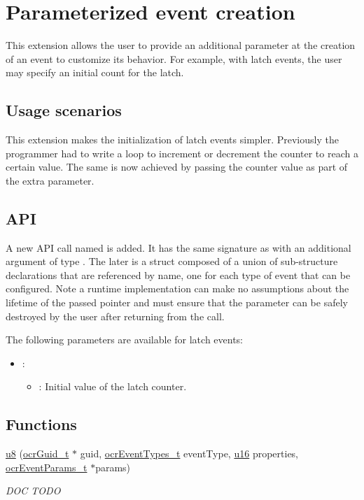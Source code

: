 \section{Parameterized event creation}
\label{sec:paramEvents}
This extension allows the user to provide an additional parameter at
the creation of an event to customize its behavior. For example, with
latch events, the user may specify an initial count for the latch.

\subsection{Usage scenarios}
This extension makes the initialization of latch events
simpler. Previously the programmer had to write a loop to increment or
decrement the counter to reach a certain value. The same is now
achieved by passing the counter value as part of the extra parameter.

\subsection{API}
A new API call named
\hyperlink{func_ocrEventCreateParams}{}
is added. It has the same signature as
\hyperlink{func_ocrEventCreate}{} with an
additional argument of type . The later is
a struct composed of a union of sub-structure declarations that are
referenced by name, one for each type of event that can be
configured. Note a runtime implementation can make no assumptions
about the lifetime of the passed pointer and must ensure that the
parameter can be safely destroyed by the user after returning from the call.

The following parameters are available for latch events:
\begin{itemize}
\item {}:
\begin{itemize}
\item {}: Initial value of the latch counter.
\end{itemize}
\end{itemize}

\subsection*{Functions}
\begin{DoxyCompactItemize}
\item
\hyperlink{type_u8}{u8} \hyperlink{func_ocrGuidMapCreate}
{}(\hyperlink{type_ocrGuid_t}{ocr\-Guid\-\_\-t}
$\ast$ guid,
\hyperlink{type_ocrEventTypes_t}{ocrEventTypes\_t} eventType,
\hyperlink{type_u16}{u16} properties,
\hyperlink{type_ocrEventParams_t}{ocrEventParams\_t} $\ast$params)
\begin{DoxyCompactList}
  \small \item \emph{DOC TODO}
\end{DoxyCompactList}
\end{DoxyCompactItemize}

